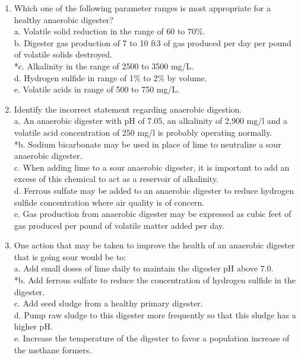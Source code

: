 \documentclass{article}
\begin{document}
\begin{enumerate}
\item  Which one of the following parameter ranges is most appropriate for a healthy anaerobic digester? \\

a. Volatile solid reduction in the range of 60 to 70\%. \\
b. Digester gas production of 7 to 10 ft3 of gas produced per day per pound of volatile solids destroyed. \\
*c. Alkalinity in the range of 2500 to 3500 mg/L. \\
d. Hydrogen sulfide in range of 1\% to 2\% by volume. \\
e. Volatile acids in range of 500 to 750 mg/L. \\

\item  Identify the incorrect statement regarding anaerobic digestion. \\

a. An anaerobic digester with pH of 7.05, an alkalinity of 2,900 mg/l and a volatile acid concentration of 250 mg/l is probably operating normally. \\
*b. Sodium bicarbonate may be used in place of lime to neutralize a sour anaerobic digester. \\
c. When adding lime to a sour anaerobic digester, it is important to add an excess of this chemical to act as a reservoir of alkalinity. \\
d. Ferrous sulfate may be added to an anaerobic digester to reduce hydrogen sulfide concentration where air quality is of concern. \\
e. Gas production from anaerobic digester may be expressed as cubic feet of gas produced per pound of volatile matter added per day. \\

\item  One action that may be taken to improve the health of an anaerobic digester that is going sour would be to: \\

a. Add small doses of lime daily to maintain the digester pH above 7.0. \\
*b. Add ferrous sulfate to reduce the concentration of hydrogen sulfide in the digester. \\
c. Add seed sludge from a healthy primary digester. \\
d. Pump raw sludge to this digester more frequently so that this sludge has a higher pH. \\
e. Increase the temperature of the digester to favor a population increase of the methane formers. \\


\end{enumerate}
\end{document}
